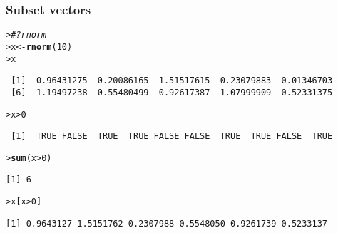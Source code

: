 \documentclass[13pt,aspectratio=169]{beamer}\usepackage[]{graphicx}\usepackage[]{color}
\makeatletter
\newcommand{\hlnum}[1]{\textcolor[rgb]{0.686,0.059,0.569}{#1}}%
\newcommand{\hlcom}[1]{\textcolor[rgb]{0.678,0.584,0.686}{\textit{#1}}}%
\newcommand{\hlopt}[1]{\textcolor[rgb]{0,0,0}{#1}}%
\newcommand{\hlstd}[1]{\textcolor[rgb]{0.345,0.345,0.345}{#1}}%
\newcommand{\hlkwb}[1]{\textcolor[rgb]{0.69,0.353,0.396}{#1}}%
\newcommand{\hlkwd}[1]{\textcolor[rgb]{0.737,0.353,0.396}{\textbf{#1}}}%
\newenvironment{kframe}{%
 \def\at@end@of@kframe{}%
 \ifinner\ifhmode%
  \def\at@end@of@kframe{\end{minipage}}%
  \begin{minipage}{\columnwidth}%
 \fi\fi%
 \def\FrameCommand##1{\hskip\@totalleftmargin \hskip-\fboxsep
 \colorbox{shadecolor}{##1}\hskip-\fboxsep
     \hskip-\linewidth \hskip-\@totalleftmargin \hskip\columnwidth}%
 \MakeFramed {\advance\hsize-\width
   \@totalleftmargin\z@ \linewidth\hsize
   \@setminipage}}%
 {\par\unskip\endMakeFramed%
 \at@end@of@kframe}
\newenvironment{knitrout}{}{} %
\renewenvironment{knitrout}{\setlength{\topsep}{0mm}}{}
\makeatother
\begin{document}
\begin{frame}[fragile]
    \frametitle{Subset vectors}
\begin{knitrout}\small
{}\color{fgcolor}\begin{kframe}
\begin{alltt}
\hlstd{> }\hlcom{#?rnorm}
\hlstd{> }\hlstd{x} \hlkwb{<-} \hlkwd{rnorm}\hlstd{(}\hlnum{10}\hlstd{)}
\hlstd{> }\hlstd{x}
\end{alltt}
\begin{verbatim}
 [1]  0.96431275 -0.20086165  1.51517615  0.23079883 -0.01346703
 [6] -1.19497238  0.55480499  0.92617387 -1.07999909  0.52331375
\end{verbatim}
\begin{alltt}
\hlstd{> }\hlstd{x} \hlopt{>} \hlnum{0}
\end{alltt}
\begin{verbatim}
 [1]  TRUE FALSE  TRUE  TRUE FALSE FALSE  TRUE  TRUE FALSE  TRUE
\end{verbatim}
\begin{alltt}
\hlstd{> }\hlkwd{sum}\hlstd{(x} \hlopt{>} \hlnum{0}\hlstd{)}
\end{alltt}
\begin{verbatim}
[1] 6
\end{verbatim}
\begin{alltt}
\hlstd{> }\hlstd{x[x} \hlopt{>} \hlnum{0}\hlstd{]}
\end{alltt}
\begin{verbatim}
[1] 0.9643127 1.5151762 0.2307988 0.5548050 0.9261739 0.5233137
\end{verbatim}
\end{kframe}
\end{knitrout}
\end{frame}
\end{document}
